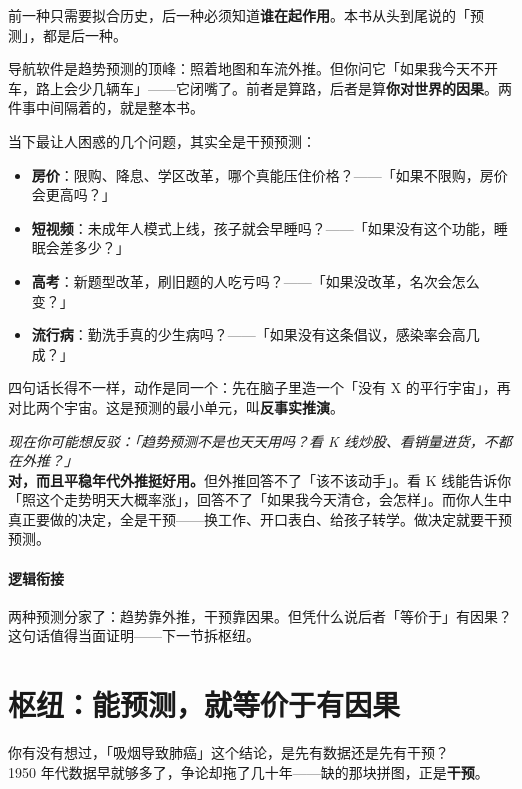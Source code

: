 \documentclass[../../main2.tex]{subfiles}
\begin{document}
前一种只需要拟合历史，后一种必须知道\textbf{谁在起作用}。本书从头到尾说的「预测」，都是后一种。

\begin{tcolorbox}[colback=green!5, title=\textit{生活类比}]
	导航软件是趋势预测的顶峰：照着地图和车流外推。但你问它「如果我今天不开车，路上会少几辆车」——它闭嘴了。前者是算路，后者是算\textbf{你对世界的因果}。两件事中间隔着的，就是整本书。
\end{tcolorbox}

当下最让人困惑的几个问题，其实全是干预预测：

\begin{itemize}
	\item \textbf{房价}：限购、降息、学区改革，哪个真能压住价格？——「如果不限购，房价会更高吗？」
	\item \textbf{短视频}：未成年人模式上线，孩子就会早睡吗？——「如果没有这个功能，睡眠会差多少？」
	\item \textbf{高考}：新题型改革，刷旧题的人吃亏吗？——「如果没改革，名次会怎么变？」
	\item \textbf{流行病}：勤洗手真的少生病吗？——「如果没有这条倡议，感染率会高几成？」
\end{itemize}

四句话长得不一样，动作是同一个：先在脑子里造一个「没有 X 的平行宇宙」，再对比两个宇宙。这是预测的最小单元，叫\textbf{反事实推演}。

\begin{questionbox}
	\textit{现在你可能想反驳：「趋势预测不是也天天用吗？看 K 线炒股、看销量进货，不都在外推？」}\\
	\textbf{对，而且平稳年代外推挺好用。}但外推回答不了「该不该动手」。看 K 线能告诉你「照这个走势明天大概率涨」，回答不了「如果我今天清仓，会怎样」。而你人生中真正要做的决定，全是干预——换工作、开口表白、给孩子转学。做决定就要干预预测。
\end{questionbox}

\paragraph*{逻辑衔接}
	两种预测分家了：趋势靠外推，干预靠因果。但凭什么说后者「等价于」有因果？这句话值得当面证明——下一节拆枢纽。

\section{枢纽：能预测，就等价于有因果}

\begin{readingnote}
	你有没有想过，「吸烟导致肺癌」这个结论，是先有数据还是先有干预？\\
	1950 年代数据早就够多了，争论却拖了几十年——缺的那块拼图，正是\textbf{干预}。
\end{readingnote}
\end{document}

